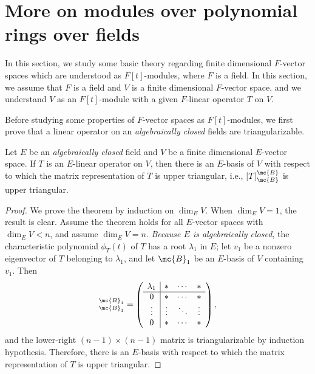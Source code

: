 \section{More on modules over polynomial rings over fields}

In this section, we study some basic theory regarding finite dimensional $F$-vector spaces which are understood as $F[t]$-modules, where $F$ is a field.
In this section, we assume that $F$ is a field and $V$ is a finite dimensional $F$-vector space, and we understand $V$ as an $F[t]$-module with a given $F$-linear operator $T$ on $V$.

Before studying some properties of $F$-vector spaces as $F[t]$-modules, we first prove that a linear operator on an \textit{algebraically closed} fields are triangularizable.
\begin{thm}[Triangularization]
    Let $E$ be an \textit{algebraically closed} field and $V$ be a finite dimensional $E$-vector space.
    If $T$ is an $E$-linear operator on $V$, then there is an $E$-basis of $V$ with respect to which the matrix representation of $T$ is upper triangular, i.e., $[T]^\mc{B}_\mc{B}$ is upper triangular.
\end{thm}
\begin{proof}
    We prove the theorem by induction on $\dim_E V$.
    When $\dim_E V=1$, the result is clear.
    Assume the theorem holds for all $E$-vector spaces with $\dim_E V<n$, and assume $\dim_E V=n$.
    \textit{Because $E$ is algebraically closed}, the characteristic polynomial $\phi_T(t)$ of $T$ has a root $\lambda_1$ in $E$; let $v_1$ be a nonzero eigenvector of $T$ belonging to $\lambda_1$, and let $\mc{B}_1$ be an $E$-basis of $V$ containing $v_1$.
    Then
    \begin{align*}
        [T]^{\mc{B}_1}_{\mc{B}_1}=\left(\begin{array}{c|ccc}
            \lambda_1 & *    & \cdots & *\\\hline
            0         & *    & \cdots & *\\
            \vdots    &\vdots& \ddots &\vdots\\
            0         & *    & \cdots & *
        \end{array}\right),
    \end{align*}
    and the lower-right $(n-1)\times(n-1)$ matrix is triangularizable by induction hypothesis.
    Therefore, there is an $E$-basis with respect to which the matrix representation of $T$ is upper triangular.
\end{proof}

